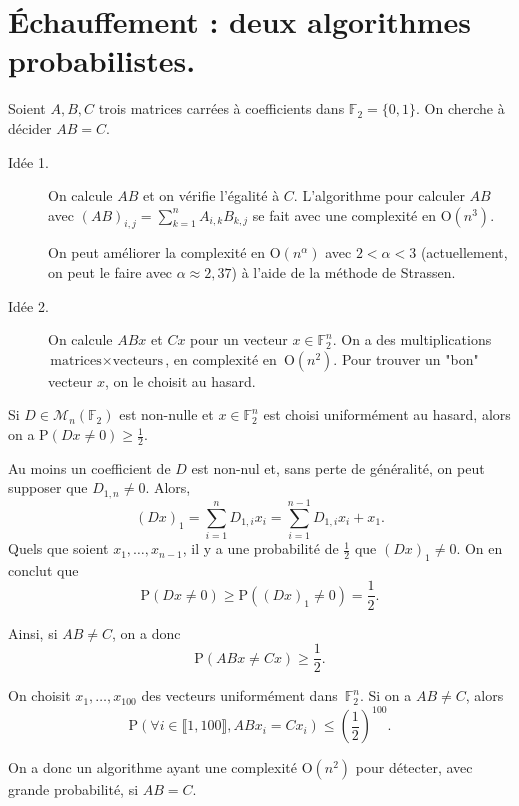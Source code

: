 \documentclass[./main]{subfiles}
\begin{document}
  \chapter{Échauffement : deux algorithmes probabilistes.}

  \begin{exm}
    Soient $A, B, C$ trois matrices carrées à coefficients dans $\mathds{F}_2 = \{0,1\}$.
    On cherche à décider $AB = C$.

    \begin{description}
      \item[Idée 1.]
        On calcule $AB$ et on vérifie l'égalité à $C$.
        L'algorithme pour calculer $AB$ avec $(AB)_{i,j} = \sum_{k = 1}^n A_{i,k} B_{k,j}$ se fait avec une complexité en $\mathrm{O}(n^3)$.

        On peut améliorer la complexité en $\mathrm{O}(n^\alpha)$ avec $2 < \alpha < 3$ (actuellement, on peut le faire avec $\alpha \approx 2{,}37$) à l'aide de la méthode de Strassen.

      \item[Idée 2.]
        On calcule $ABx$ et $Cx$ pour un vecteur  $x \in \mathds{F}_2^n$.
        On a des multiplications $\text{matrices} \times \text{vecteurs}$, en complexité en~$\mathrm{O}(n^2)$.
        Pour trouver un "bon" vecteur $x$, on le choisit au hasard.
    \end{description}
    \label{exm:chap0-exm1}
  \end{exm}

  \begin{lem}
    Si $D \in \mathcal{M}_n(\mathds{F}_2)$ est non-nulle et $x \in \mathds{F}_2^n$ est choisi uniformément au hasard, alors on a $\mathrm{P}(Dx \neq 0) \ge \frac{1}{2}$.
  \end{lem}
  \begin{prv}
    Au moins un coefficient de $D$ est non-nul et, sans perte de généralité, on peut supposer que $D_{1,n} \neq 0$.
    Alors, 
    \[
      (Dx)_1 = \sum_{i=1}^n D_{1,i} x_i = \sum_{i=1}^{n-1} D_{1,i} x_i + x_{1}
    .\] 
    Quels que soient $x_1, \ldots, x_{n-1}$, il y a une probabilité de $\frac{1}{2}$ que $(Dx)_1 \neq 0$.
    On en conclut que \[ \mathrm{P}(Dx \neq 0) \ge  \mathrm{P}((Dx)_1 \neq 0) = \frac{1}{2}. \]
  \end{prv}

  \begin{exm}
    Ainsi, si $AB \neq C$, on a donc \[\mathrm{P}(AB x \neq Cx) \ge \frac{1}{2}. \]

    On choisit $x_1, \ldots, x_{100}$ des vecteurs uniformément dans~$\mathds{F}_2^n$.
    Si on a $AB \neq C$, alors \[
    \mathrm{P}(\forall i \in \llbracket 1,100\rrbracket, ABx_i = Cx_i) \le \left(\frac{1}{2}\right)^{100}
    .\]

    On a donc un algorithme ayant une complexité $\mathrm{O}(n^2)$ pour détecter, avec grande probabilité, si $AB = C$.
  \end{exm}
\end{document}
